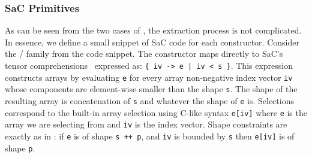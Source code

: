 {\subsubsection{SaC Primitives\label{sec:sac-primitives}}
As can be seen from the two cases of , the extraction process is
not complicated. In essence, we define a small snippet of SaC code for 
each  constructor.  Consider the /
family from the code snippet.  The  constructor maps directly to SaC's
tensor comprehensions~\cite{tensor-comp} expressed as: \texttt{\{ iv -> e | iv < s \}}.
This expression constructs arrays by evaluating \texttt{e} for every array non-negative index
vector
\texttt{iv} whose components are element-wise smaller than the shape \texttt{s}.  The shape of the resulting
array is concatenation of \texttt{s} and whatever the shape of \texttt{e} is.
Selections  correspond to the built-in array selection using
C-like syntax \texttt{e[iv]} where \texttt{e} is the array we are selecting
from and \texttt{iv} is the index vector.   Shape constraints are exactly as in
: if \texttt{e} is of shape \texttt{s ++ p}, and \texttt{iv} is bounded
by \texttt{s} then \texttt{e[iv]} is of shape \texttt{p}.

}
